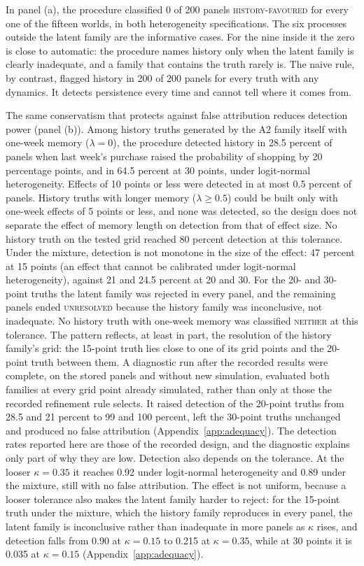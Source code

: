 \documentclass[11pt]{article}
\newcommand{\verdict}[1]{\textsc{#1}}
\begin{document}
In panel (a), the procedure classified 0 of 200 panels \verdict{history-favoured} for every
one of the fifteen worlds, in both heterogeneity specifications. The six processes outside the
latent family are the informative cases. For the nine inside it the zero is close to
automatic: the procedure names history only when the latent family is clearly inadequate, and
a family that contains the truth rarely is. The naive rule, by contrast, flagged history in
200 of 200 panels for every truth with any dynamics. It detects persistence every time and
cannot tell where it comes from.

The same conservatism that protects against false attribution reduces detection power
(panel (b)). Among history truths
generated by the A2 family itself with one-week memory ($\lambda=0$), the procedure detected history in 28.5
percent of panels when last week's purchase raised the probability of shopping by 20
percentage points, and in 64.5 percent at 30 points, under logit-normal heterogeneity. Effects
of 10 points or less were detected in at most 0.5 percent of panels. History truths with longer
memory ($\lambda\ge 0.5$) could be built only with one-week effects of 5 points or less, and none
was detected, so the design does not separate the effect of memory length on detection from
that of effect size. No history truth on the tested grid reached 80
percent detection at this tolerance. Under the mixture, detection is not monotone in the size of the effect: 47
percent at 15 points (an effect that cannot be calibrated under logit-normal heterogeneity),
against 21 and 24.5 percent at 20 and 30. For the 20- and 30-point truths the latent family
was rejected in every panel, and the remaining panels ended \verdict{unresolved} because the
history family was inconclusive, not inadequate. No history truth with one-week memory was
classified \verdict{neither} at this tolerance. The pattern reflects, at least in part, the
resolution of the history family's grid: the 15-point truth lies close to one of its grid points
and the 20-point truth between them. A diagnostic run after the recorded results were complete,
on the stored panels and without new simulation, evaluated both families at every grid point
already simulated, rather than only at those the recorded refinement rule selects. It raised
detection of the 20-point truths from 28.5 and 21 percent to 99 and 100 percent, left the
30-point truths unchanged and produced no false attribution (Appendix~\ref{app:adequacy}). The
detection rates reported here are those of the recorded design, and the diagnostic explains only
part of why they are low.
Detection also depends on the tolerance. At the looser $\kappa=0.35$ it reaches 0.92 under
logit-normal heterogeneity and 0.89 under the mixture, still with no false attribution. The
effect is not uniform, because a looser tolerance also makes the latent family harder to reject:
for the 15-point truth under the mixture, which the history family reproduces in every panel,
the latent family is inconclusive rather than inadequate in more panels as $\kappa$ rises, and
detection falls from 0.90 at $\kappa=0.15$ to 0.215 at $\kappa=0.35$, while at 30 points it is
0.035 at $\kappa=0.15$ (Appendix~\ref{app:adequacy}).
\end{document}
